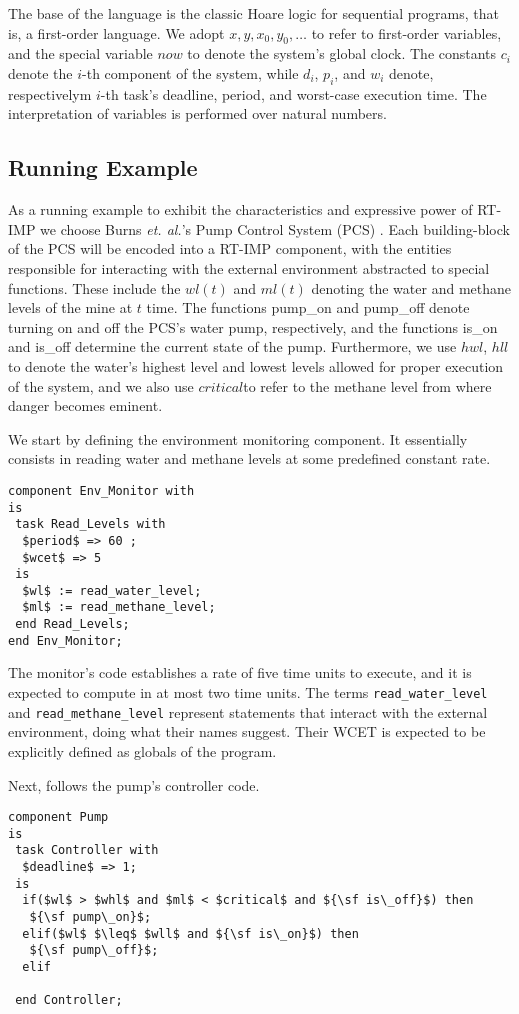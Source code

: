 \documentclass{llncs}
\begin{document}
The base of the language is the classic Hoare logic for sequential programs, that is, a first-order language. We adopt $x,y,x_0,y_0,\ldots$ to refer to first-order variables, and the special variable $now$ to denote the system's global clock. The constants $c_i$ denote the $i$-th component of the system, while $d_i$, $p_i$, and $w_i$ denote, respectivelym $i$-th task's deadline, period, and worst-case execution time. The interpretation of variables is performed over natural numbers.


\subsection{Running Example}

As a running example to exhibit the characteristics and expressive power of RT-IMP we choose Burns {\sl et. al.}'s Pump Control System (PCS) \cite{}. Each building-block of the PCS will be encoded into a RT-IMP component, with the entities responsible for interacting with the external environment abstracted to special functions. These include the $wl(t)$ and $ml(t)$ denoting the water and methane levels of the mine at $t$ time. The functions {\sf pump\_on} and {\sf pump\_off} denote turning on and off the PCS's water pump, respectively, and the functions {\sf is\_on} and {\sf is\_off} determine the current state of the pump. Furthermore, we use $hwl$, $hll$ to denote the water's highest level and lowest levels allowed for proper execution of the system, and we also use $critical$to refer to the methane level from where danger becomes eminent.  

We start by defining the environment monitoring component. It essentially consists in reading water and methane levels at some predefined constant rate.
\begin{lstlisting}
component Env_Monitor with
is
 task Read_Levels with 
  $period$ => 60 ; 
  $wcet$ => 5
 is
  $wl$ := read_water_level;
  $ml$ := read_methane_level;
 end Read_Levels;
end Env_Monitor;
\end{lstlisting}
The monitor's code establishes a rate of five time units to execute, and it is expected to compute in at most two time units. The terms {\tt read\_water\_level} and {\tt read\_methane\_level} represent statements that interact with the external environment, doing what their names suggest. Their WCET is expected to be explicitly defined as globals of the program. 

Next, follows the pump's controller code. 
\begin{lstlisting}
component Pump
is
 task Controller with
  $deadline$ => 1;
 is
  if($wl$ > $whl$ and $ml$ < $critical$ and ${\sf is\_off}$) then 
   ${\sf pump\_on}$;
  elif($wl$ $\leq$ $wll$ and ${\sf is\_on}$) then
   ${\sf pump\_off}$;
  elif

 end Controller;
\end{lstlisting}
\end{document}
